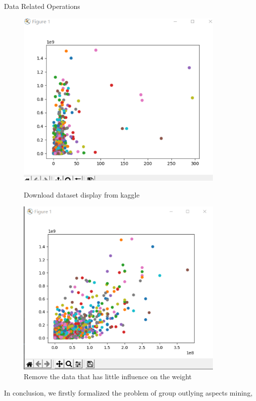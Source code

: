 \documentclass[
 size=14pt,
 paper=smartboard,  %
 mode=present, 		%
 display=slides, 	%
 style=tuliplab,  	%
 pauseslide,
 fleqn,leqno]{powerdot}
\begin{document}
\begin{slide}[toc=,bm=]{ Data Related Operations}
\begin{itemize}
  \end{itemize}
  \begin{figure}[htbp]
    \centering
    \begin{minipage}[t]{0.48\textwidth}
      \centering
      \includegraphics[width=0.9\textwidth]{logos/13.eps}
      \vspace{-1.4em}
      \caption{Download dataset display from kaggle}
    \end{minipage}
    \begin{minipage}[t]{0.48\textwidth}
      \centering
      \includegraphics[width=0.9\textwidth]{logos/14.eps}
      \vspace{-1.4em}
      \caption{Remove the data that has little influence on the weight}
    \end{minipage}
  \end{figure}
  \begin{note}
  In conclusion,
  we firstly formalized the problem of
  group outlying aspects mining,
  

\end{note}
\end{slide}
\end{document}
